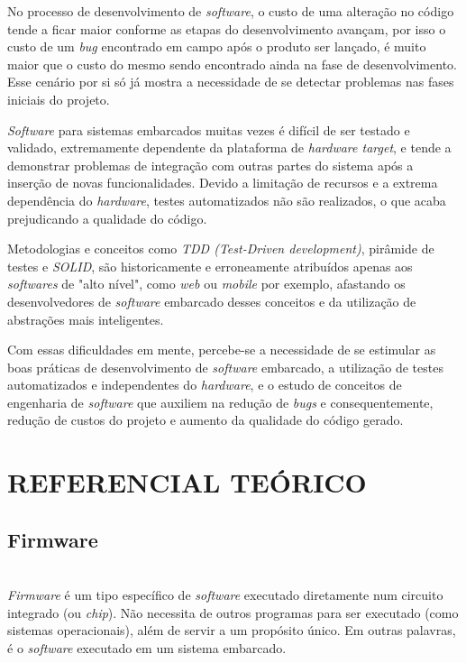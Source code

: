 \documentclass[times, twoside, watermark]{artigo}
\begin{document}
No processo de desenvolvimento de \textit{software}, o custo de uma alteração no 
código tende a ficar maior conforme  as etapas do desenvolvimento avançam, por isso 
o custo de um \textit{bug} encontrado em campo após o produto ser lançado, é muito 
maior que o custo do mesmo sendo encontrado ainda na fase de desenvolvimento\cite{firmwarecost}.
Esse cenário por si só já mostra a necessidade de se detectar problemas nas fases iniciais do projeto.

\textit{Software} para sistemas embarcados muitas vezes é difícil de ser testado e 
validado, extremamente dependente da plataforma de \textit{hardware target}, e 
tende a demonstrar problemas de integração com outras
partes do sistema após a inserção de novas funcionalidades. 
Devido a limitação de recursos e a extrema dependência do \textit{hardware}, testes 
automatizados não são realizados, o que acaba prejudicando a qualidade do código.

Metodologias e conceitos como \textit{TDD (Test-Driven development)}, pirâmide de 
testes e \textit{SOLID}, são historicamente e erroneamente atribuídos apenas
aos \textit{softwares} de "alto nível", como \textit{web} ou 
\textit{mobile} por exemplo, afastando os desenvolvedores de \textit{software} 
embarcado desses conceitos e da utilização de abstrações mais inteligentes. 

Com essas dificuldades em mente, percebe-se a necessidade de se estimular as boas 
práticas de desenvolvimento de \textit{software} embarcado, a utilização de testes 
automatizados e independentes do \textit{hardware}, e o estudo de conceitos de 
engenharia de \textit{software} que auxiliem na
redução de \textit{bugs} e consequentemente, redução de custos do projeto e aumento 
da qualidade do código gerado. \hfill\\




\section{REFERENCIAL TEÓRICO}

\subsection{Firmware}\hfill\\

\textit{Firmware} é um tipo específico de \textit{software} executado diretamente
num circuito integrado (ou \textit{chip}). 
Não necessita de outros programas para ser executado (como sistemas operacionais),
além de servir a um propósito único. 
Em outras palavras, é o \textit{software} executado em um sistema
embarcado\cite{ganssle2004firmware}.
\end{document}
